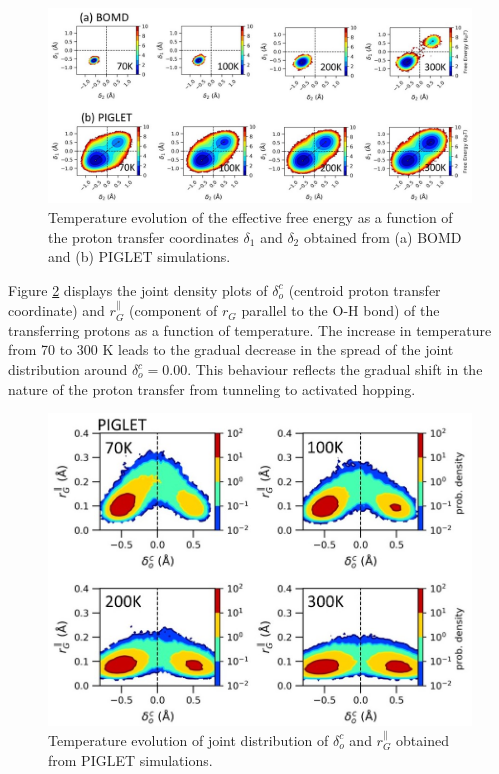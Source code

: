 \begin{figure}[!ht]
    \centering
    \includegraphics[width=16cm ]{./Appendix4/new_figures_si/figure_14.jpg}
    \caption{Temperature evolution of the effective free energy as a function of the proton transfer coordinates $\delta_1$ and $\delta_2$ obtained from (a) BOMD and  (b) PIGLET simulations.}
    \label{fig:cip14}
\end{figure}

Figure \ref{fig:cip11} displays the joint density plots of $\delta^c_o$ (centroid proton transfer coordinate) and $r^{\parallel}_G$ (component of $r_G$ parallel to the O-H bond) of the transferring protons as a function of temperature. The increase in temperature from 70 to 300 K leads to the gradual decrease in the spread of the joint distribution around $\delta^c_o = 0.00$. This behaviour reflects the gradual shift in the nature of the proton transfer from tunneling to activated hopping.

\begin{figure}[!ht]
    \centering
    \includegraphics[width=15cm ]{./Appendix4/new_figures_si/figure11.jpg}
    \caption{Temperature evolution of joint distribution of $\delta^c_o$ and $r^{\parallel}_G$ obtained from PIGLET simulations.}
    \label{fig:cip11}
\end{figure}


